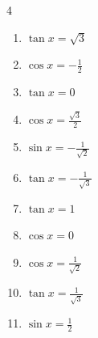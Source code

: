 \begin{multicols}{4}
\begin{enumerate}

  \item $\displaystyle \tan{x}  = \sqrt{3}$


  \item $\displaystyle \cos{x}  = -\frac{1}{2}$


  \item $\displaystyle \tan{x}  = 0$

        \phantom{$\displaystyle x = 0 , \pi$}

\columnbreak %

  \item $\displaystyle \cos{x}  = \frac{\sqrt{3}}{2}$


  \item $\displaystyle \sin{x}  = -\frac{1}{\sqrt{2}}$


  \item $\displaystyle \tan{x}  = -\frac{1}{\sqrt{3}}$


  \item $\displaystyle \tan{x}  = 1$


  \item $\displaystyle \cos{x}  = 0$


  \item $\displaystyle \cos{x}  = \frac{1}{\sqrt{2}}$


  \item $\displaystyle \tan{x}  = \frac{1}{\sqrt{3}}$


  \item $\displaystyle \sin{x}  = \frac{1}{2}$


\end{enumerate}
\end{multicols}
